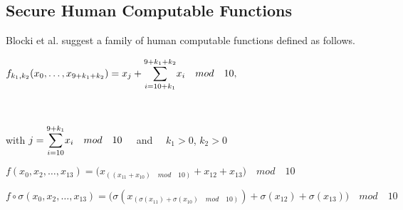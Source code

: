 \subsection{Secure Human Computable Functions}\label{secfuncs}
Blocki et al. \cite{hcp-blocki} suggest a family of human computable functions defined as follows.
\centerline{ $ f_{k_1,k_2}(x_0,\dots,x_{9+k_1+k_2})= x_j + \mathlarger{\sum}\limits^{9+k_1+k_2}_{i=10+k_1} x_i \quad mod\quad 10,$}\\
\centerline{with $j = \mathlarger{\sum}\limits^{9+k_1}_{i=10} x_i \quad mod \quad 10\quad$ and $\quad k_1>0$, $k_2>0$ }
\vspace{2mm}


\begin{definition}
    \label{f-function}
    $f(x_0,x_2,\dots,x_{13}) = \big( x_{(( x_{11} + x_{10} )\quad mod \quad 10)} + x_{12} + x_{13} \big)\quad mod \quad 10$ 
\end{definition} 

\begin{definition}
    \label{fo-function}
    $f\circ \sigma(x_0,x_2,\dots,x_{13}) = \big(\sigma ( x_{(\sigma(x_{11}) + \sigma(x_{10})\quad mod \quad 10)} ) +\sigma ( x_{12} ) + \sigma( x_{13} )\big)\quad mod \quad 10$ 
\end{definition}

